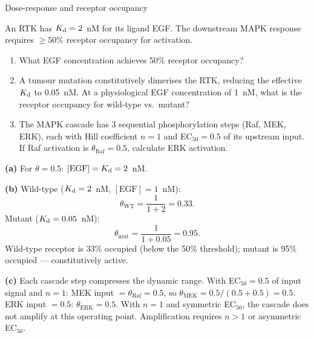 \documentclass[12pt, a4paper, oneside]{report}
\begin{document}
\begin{problem}{\enspace{}\enspace
  Dose-response and receptor occupancy}

  An RTK has $K_{\mathrm{d}} = 2$~nM for its ligand EGF. The downstream MAPK
  response requires $\geq 50\%$ receptor occupancy for activation.

  \begin{enumerate}
    \item What EGF concentration achieves 50\% receptor occupancy?
    \item A tumour mutation constitutively dimerises the RTK, reducing
          the effective $K_{\mathrm{d}}$ to 0.05~nM. At a physiological EGF
          concentration of 1~nM, what is the receptor occupancy for
          wild-type vs.\ mutant?
    \item The MAPK cascade has 3 sequential phosphorylation steps
          (Raf, MEK, ERK), each with Hill coefficient $n=1$ and
          EC$_{50} = 0.5$ of its upstream input. If Raf activation
          is $\theta_\text{Raf} = 0.5$, calculate ERK activation.
  \end{enumerate}
\end{problem}

\begin{solution}
  \textbf{(a)} For $\theta = 0.5$: $[\mathrm{EGF}] = K_{\mathrm{d}} = 2$~nM.

  \textbf{(b)} Wild-type ($K_{\mathrm{d}} = 2$~nM, $[\mathrm{EGF}] = 1$~nM):
  \[
    \theta_\text{WT} = \frac{1}{1+2} = 0.33.
  \]
  Mutant ($K_{\mathrm{d}} = 0.05$~nM):
  \[
    \theta_\text{mut} = \frac{1}{1 + 0.05} = 0.95.
  \]
  Wild-type receptor is 33\% occupied (below the 50\% threshold);
  mutant is 95\% occupied — constitutively active.

  \textbf{(c)} Each cascade step compresses the dynamic range.
  With EC$_{50} = 0.5$ of input signal and $n=1$:
  MEK input $= \theta_\text{Raf} = 0.5$, so
  $\theta_\text{MEK} = 0.5/(0.5 + 0.5) = 0.5$.
  ERK input $= 0.5$: $\theta_\text{ERK} = 0.5$.
  With $n=1$ and symmetric EC$_{50}$, the cascade does not amplify at
  this operating point. Amplification requires $n>1$ or asymmetric
  EC$_{50}$.
\end{solution}
\end{document}
